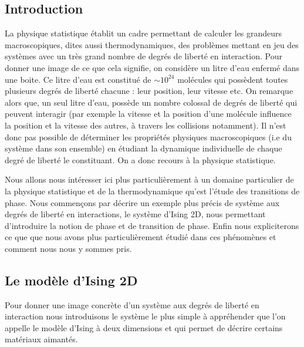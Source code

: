 \documentclass[10.5pt]{article}
\begin{document}
\pagebreak
\begin{multicols*}{2}

\section{Introduction}


La physique statistique établit un cadre permettant de calculer les grandeurs macroscopiques, dites aussi thermodynamiques, des problèmes mettant en jeu des systèmes avec un très grand nombre de degrés de liberté en interaction. Pour donner une image de ce que cela signifie, on considère un litre d'eau enfermé dans une boite. Ce litre d'eau est constitué de $\sim 10^{24}$ molécules qui possèdent toutes plusieurs degrés de liberté chacune : leur position, leur vitesse etc. On remarque alors que, un seul litre d'eau, possède un nombre colossal de degrés de liberté qui peuvent interagir (par exemple la vitesse et la position d'une molécule influence la position et la vitesse des autres, à travers les collisions notamment). Il n'est donc pas possible de déterminer les propriétés physiques macroscopiques (i.e du système dans son ensemble) en étudiant la dynamique individuelle de chaque degré de liberté le constituant. On a donc recours à la physique statistique. 

Nous allons nous intéresser ici plus particulièrement à un domaine particulier de la physique statistique et de la thermodynamique qu'est l'étude des transitions de phase. Nous commençons par décrire un exemple plus précis de système aux degrés de liberté en interactions, le système d'Ising 2D, nous permettant d'introduire la notion de phase et de transition de phase. Enfin nous expliciterons ce que que nous avons plus particulièrement étudié dans ces phénomènes et comment nous nous y sommes pris. \\




\subsection{Le modèle d'Ising 2D}


\label{sec:IsingIntro}

Pour donner une image concrète d'un système aux degrés de liberté en interaction nous introduisons le système le plus simple à appréhender que l'on appelle le modèle d'Ising à deux dimensions et qui permet de décrire certains matériaux aimantés. \\


\end{multicols*}
\end{document}
